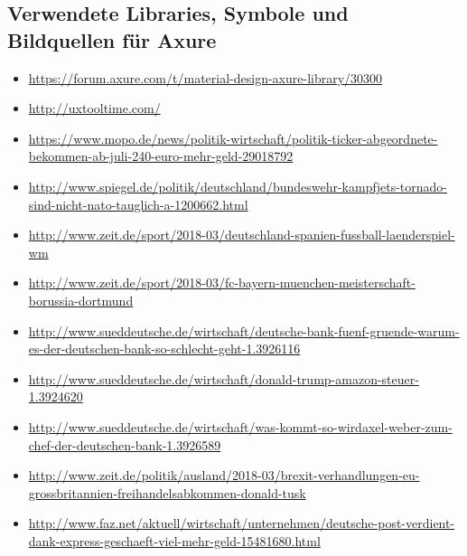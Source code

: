 \subsection{Verwendete Libraries, Symbole und Bildquellen für Axure}


\begin{itemize}
  \sloppy

  \item \url{https://forum.axure.com/t/material-design-axure-library/30300}
  \item \url{http://uxtooltime.com/}

  \item \url{https://www.mopo.de/news/politik-wirtschaft/politik-ticker-abgeordnete-bekommen-ab-juli-240-euro-mehr-geld-29018792}
  \item \url{http://www.spiegel.de/politik/deutschland/bundeswehr-kampfjets-tornado-sind-nicht-nato-tauglich-a-1200662.html}
  \item \url{http://www.zeit.de/sport/2018-03/deutschland-spanien-fussball-laenderspiel-wm}
  \item \url{http://www.zeit.de/sport/2018-03/fc-bayern-muenchen-meisterschaft-borussia-dortmund}
  \item \url{http://www.sueddeutsche.de/wirtschaft/deutsche-bank-fuenf-gruende-warum-es-der-deutschen-bank-so-schlecht-geht-1.3926116}
  \item \url{http://www.sueddeutsche.de/wirtschaft/donald-trump-amazon-steuer-1.3924620}
  \item \url{http://www.sueddeutsche.de/wirtschaft/was-kommt-so-wirdaxel-weber-zum-chef-der-deutschen-bank-1.3926589}
  \item \url{http://www.zeit.de/politik/ausland/2018-03/brexit-verhandlungen-eu-grossbritannien-freihandelsabkommen-donald-tusk}
  \item \url{http://www.faz.net/aktuell/wirtschaft/unternehmen/deutsche-post-verdient-dank-express-geschaeft-viel-mehr-geld-15481680.html}
\end{itemize}

